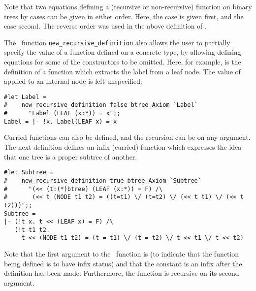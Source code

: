 \noindent Note that two equations defining a (recursive or non-recursive)
function on binary trees by cases can be given in either order.  Here, the
 case is given first, and the  case second.  The reverse
order was used in the above definition of .

The \ML\ function  {\small\verb!new_recursive_definition!} also allows the user
to partially specify the value of a function defined on a concrete type, by
allowing defining equations for some of the constructors to be omitted.  Here,
for example, is the definition of a function  which extracts the
label from a leaf node.  The value of  applied to an internal node
is left unspecified:

\begin{session}\begin{verbatim}
#let Label =
#    new_recursive_definition false btree_Axiom `Label`
#      "Label (LEAF (x:*)) = x";;
Label = |- !x. Label(LEAF x) = x
\end{verbatim}\end{session}

Curried functions can also be defined, and the recursion can be on any
argument.  The next definition defines an infix (curried)
function \ml{<<} which expresses the idea that one tree is a proper
subtree of another.

\begin{session}\begin{verbatim}
#let Subtree =
#    new_recursive_definition true btree_Axiom `Subtree`
#      "(<< (t:(*)btree) (LEAF (x:*)) = F) /\
#       (<< t (NODE t1 t2) = ((t=t1) \/ (t=t2) \/ (<< t t1) \/ (<< t t2)))";;
Subtree =
|- (!t x. t << (LEAF x) = F) /\
   (!t t1 t2.
     t << (NODE t1 t2) = (t = t1) \/ (t = t2) \/ t << t1 \/ t << t2)
\end{verbatim}\end{session}

\noindent Note that the first argument to the \ML\ function is 
(to indicate that the function being defined is to have infix status) and that
the constant \ml{<<} is an infix after the definition has been made.
Furthermore, the function \ml{<<} is recursive on its second argument.

